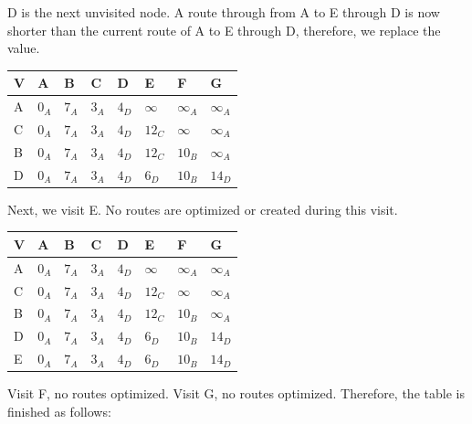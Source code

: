 \documentclass{article}
\begin{document}
D is the next unvisited node. A route through from A to E through D is now shorter than the current route of A to E through D, therefore, we replace the value. 

\begin{table}[H]
\begin{tabular}{|l|l|l|l|l|l|l|l|}
\hline
V & \textbf{A} & \textbf{B} & \textbf{C} & \textbf{D} & E & F & G \\ \hline
A & $0_A$ & $7_A$ & $3_A$ & $4_D$ & $\infty$ & $\infty_A$ & $\infty_A$ \\ \hline
C & $0_A$ & $7_A$ & $3_A$ & $4_D$ & $12_C$ & $\infty$ & $\infty_A$ \\ \hline
B & $0_A$ & $7_A$ & $3_A$ & $4_D$ & $12_C$ & $10_B$ & $\infty_A$ \\ \hline
D & $0_A$ & $7_A$ & $3_A$ & $4_D$ & $6_D$ & $10_B$ & $14_D$ \\ \hline
\end{tabular}
\end{table}

Next, we visit E. No routes are optimized or created during this visit. 

\begin{table}[H]
\begin{tabular}{|l|l|l|l|l|l|l|l|}
\hline
V & \textbf{A} & \textbf{B} & \textbf{C} & \textbf{D} & \textbf{E} & F & G \\ \hline
A & $0_A$ & $7_A$ & $3_A$ & $4_D$ & $\infty$ & $\infty_A$ & $\infty_A$ \\ \hline
C & $0_A$ & $7_A$ & $3_A$ & $4_D$ & $12_C$ & $\infty$ & $\infty_A$ \\ \hline
B & $0_A$ & $7_A$ & $3_A$ & $4_D$ & $12_C$ & $10_B$ & $\infty_A$ \\ \hline
D & $0_A$ & $7_A$ & $3_A$ & $4_D$ & $6_D$ & $10_B$ & $14_D$ \\ \hline
E & $0_A$ & $7_A$ & $3_A$ & $4_D$ & $6_D$ & $10_B$ & $14_D$ \\ \hline
\end{tabular}
\end{table}

Visit F, no routes optimized. Visit G, no routes optimized. Therefore, the table is finished as follows:
\end{document}
